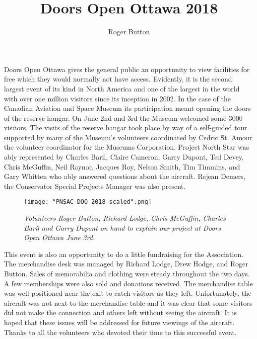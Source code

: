 




\title{Doors Open Ottawa 2018}
\author{Roger Button}

\maketitle

Doors Open Ottawa gives the general public an opportunity to view facilities for free which they would
normally not have access. Evidently, it is the second largest event of its kind in North America and one of
the largest in the world with over one million visitors since its inception in 2002. In the case of the
Canadian Aviation and Space Museum its participation meant opening the doors of the reserve hangar.
On June 2nd and 3rd the Museum welcomed some 3000 visitors. The visits of the reserve hangar took
place by way of a self-guided tour supported by many of the Museum's volunteers coordinated by Cedric
St. Amour the volunteer coordinator for the Museums Corporation. Project North Star was ably
represented by Charles Baril, Claire Cameron, Garry Dupont, Ted Devey, Chris McGuffin, Neil Raynor,
Jacques Roy, Nelson Smith, Tim Timmins, and Gary Whitten who ably answered questions about the
aircraft. Rejean Demers, the Conservator Special Projects Manager was also present.

\begin{figure}[httb]
   \vspace{2em}
   \centering
   \texttt{[image: "PNSAC DOO 2018-scaled".png]}
  \caption*{\small \em Volunteers Roger Button, Richard Lodge, Chris McGuffin, Charles Baril and Garry Dupont on hand to explain our project at Doors Open Ottawa June 3rd.}
   \label{fig:stab-one}
\end{figure}


This event is also an opportunity to do a little fundraising for the Association. The merchandise desk was
managed by Richard Lodge, Drew Hodge, and Roger Button. Sales of memorabilia and clothing were
steady throughout the two days. A few memberships were also sold and donations received. The
merchandise table was well positioned near the exit to catch visitors as they left. Unfortunately, the
aircraft was not next to the merchandise table and it was clear that some visitors did not make the
connection and others left without seeing the aircraft. It is hoped that these issues will be addressed for
future viewings of the aircraft. Thanks to all the volunteers who devoted their time to this successful
event.



